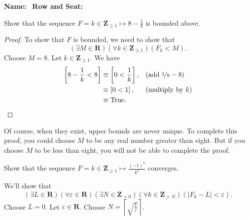 \documentclass[12pt, fleqn]{exam}
\newcommand{\reals}{\mathbf{R}}
\newcommand{\integers}{\mathbf{Z}}
\newcommand{\True}{\mathrm{True}}
\begin{document}
\large
\vspace{0.1in}
\noindent{}
{\bf Name:}\hrulefill\
\noindent {}
{\bf Row and Seat:}\hrulefill\

\vspace{0.1in}

\small
\normalsize
\begin{questions}

\question Show that the sequence $F = k \in \integers_{\geq 1} \mapsto 8 - \frac{1}{k}$ is
bounded above.
\begin{solution} 
  \begin{proof}
  To show that $F$ is bounded, we need to show that 
  \begin{equation*}
     \left(\exists M \in \reals\right)
     \left(\forall k \in \integers_{\geq 1} \right)
     \left(F_k < M\right).
  \end{equation*}
  Choose $M = 8$. Let $k \in \integers_{\geq 1} $. We have
\begin{align*}
 \left[ 8 - \frac{1}{k} < 8 \right] &\equiv \left[  0 <  \frac{1}{k} \right], && \mbox{(add $ \nicefrac{1}{k} -8$)} \\
                                               & \equiv \left[  0 < 1 \right], && \mbox{(multiply by $k$)} \\
  &\equiv \True. &&\qedhere
\end{align*}
\end{proof}
Of course, when they exist, upper bounds are never unique. To complete
this proof, you could choose $M$ to be any real number greater than eight.
But if you choose $M$ to be less than eight, you will not be able to
complete the proof.
\end{solution}
\question Show that the sequence $F = k \in \integers_{\geq 1} \mapsto \frac{(-1)^k}{k^2}$ converges.
\begin{solution} We'll show that
\begin{equation*}
 \left(\exists L \in \reals \right)
 \left(\forall \varepsilon \in \reals\right)
 \left(\exists N \in \integers_{>0}\right)
 \left(\forall k \in \integers_{>N} \right)
 \left(|F_k - L | < \varepsilon\right).
\end{equation*}
Choose $L = 0$. Let  $\varepsilon \in \reals$. Choose $N =  \left \lceil 
\sqrt{\frac{1}{\varepsilon}} \right \rceil $. 

\end{solution}
\end{questions}
\end{document}
